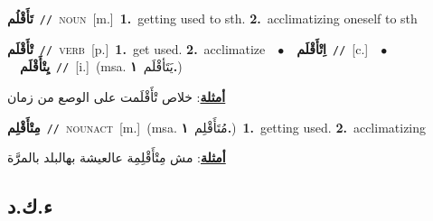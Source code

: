 \documentclass[10pt,a4paper,twoside]{article} %
\begin{document}
\begin{multicols}{2}
{\setlength\topsep{0pt}\textbf{\foreignlanguage{arabic}{تَأَقْلُم}}\ {\color{gray}\texttt{//}\color{black}}\ \textsc{noun}\ [m.]\ \textbf{1.}~getting used to sth.  \textbf{2.}~acclimatizing oneself to sth\ } \vspace{2mm}

{\setlength\topsep{0pt}\textbf{\foreignlanguage{arabic}{تْأَقْلَم}}\ {\color{gray}\texttt{//}\color{black}}\ \textsc{verb}\ [p.]\ \textbf{1.}~get used.  \textbf{2.}~acclimatize\ \ $\bullet$\ \ \setlength\topsep{0pt}\textbf{\foreignlanguage{arabic}{اِتْأَقْلَم}}\ {\color{gray}\texttt{//}\color{black}}\ [c.]\ \ $\bullet$\ \ \setlength\topsep{0pt}\textbf{\foreignlanguage{arabic}{يِتْأَقْلَم}}\ {\color{gray}\texttt{//}\color{black}}\ [i.]\ \color{gray}(msa. \foreignlanguage{arabic}{يَتَأقْلَم}~\foreignlanguage{arabic}{\textbf{١.}})\color{black}\  \begin{flushright}\color{gray}\foreignlanguage{arabic}{\textbf{\underline{\foreignlanguage{arabic}{أمثلة}}}: خلاص تْأَقْلَمت على الوصع من زمان}\end{flushright}\color{black}} \vspace{2mm}

{\setlength\topsep{0pt}\textbf{\foreignlanguage{arabic}{مِتْأَقْلِم}}\ {\color{gray}\texttt{//}\color{black}}\ \textsc{noun\textunderscore act}\ [m.]\ \color{gray}(msa. \foreignlanguage{arabic}{مُتَأَقْلِم}~\foreignlanguage{arabic}{\textbf{١.}})\color{black}\ \textbf{1.}~getting used.  \textbf{2.}~acclimatizing\  \begin{flushright}\color{gray}\foreignlanguage{arabic}{\textbf{\underline{\foreignlanguage{arabic}{أمثلة}}}: مش مِتْأَقْلِمِة عالعيشة بهالبلد بالمرَّة}\end{flushright}\color{black}} \vspace{2mm}

\vspace{-3mm}
\subsection*{\color{blue}\foreignlanguage{arabic}{ء.ك.د}\color{blue}{}} 


\end{multicols}
\end{document}
